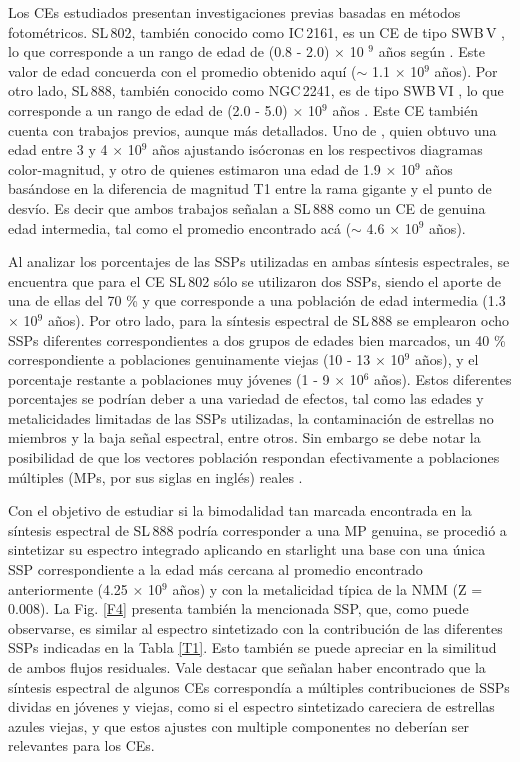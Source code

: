 \documentclass[baaa]{baaa}
\begin{document}
Los CEs estudiados presentan investigaciones previas basadas en métodos fotométricos. SL\,802, también conocido como IC\,2161, es un CE de tipo SWB\,V \citep{SWB1980}, lo que corresponde a un rango de edad de (0.8 - 2.0) $\times$ 10 $^{9}$ años según \cite{Bica1996}. Este valor de edad concuerda con el promedio obtenido aquí ($\sim$ 1.1 $\times$ 10$^{9}$ años). Por otro lado, SL\,888, también conocido como NGC\,2241, es de tipo SWB\,VI \citep{SWB1980}, lo que corresponde a un rango de edad de (2.0 - 5.0) $\times$ 10$^{9}$ años \citep{Bica1996}. Este CE también cuenta con trabajos previos, aunque más detallados. Uno de \cite{Jones1987}, quien obtuvo una edad entre 3 y 4 $\times$ 10$^{9}$ años ajustando isócronas en los respectivos diagramas color-magnitud, y otro de \cite{Geisler1997} quienes estimaron una edad de 1.9 $\times$ 10$^{9}$ años basándose en la diferencia de magnitud T1 entre la rama gigante y el punto de desvío. Es decir que ambos trabajos señalan a SL\,888 como un CE de genuina edad intermedia, tal como el promedio encontrado acá ($\sim$ 4.6 $\times$ 10$^{9}$ años).


Al analizar los porcentajes de las SSPs utilizadas en ambas síntesis espectrales, se encuentra que para el CE SL\,802 sólo se utilizaron dos SSPs, siendo el aporte de una de ellas del 70 \% y que corresponde a una población de edad intermedia (1.3 $\times$ 10$^{9}$ años). Por otro lado, para la síntesis espectral de SL\,888 se emplearon ocho SSPs diferentes correspondientes a dos grupos de edades bien marcados, un 40 \% correspondiente a poblaciones genuinamente viejas (10 - 13 $\times$ 10$^{9}$ años), y el porcentaje restante a poblaciones muy jóvenes (1 - 9 $\times$ 10$^{6}$ años). Estos diferentes porcentajes se podrían deber a una variedad de efectos, tal como las edades y metalicidades limitadas de las SSPs utilizadas, la contaminación de estrellas no miembros y la baja señal espectral, entre otros. Sin embargo se debe notar la posibilidad de que los vectores población respondan efectivamente a poblaciones múltiples (MPs, por sus siglas en inglés) reales \citep{AVA2019}. 


Con el objetivo de estudiar si la bimodalidad tan marcada encontrada en la síntesis espectral de SL\,888 podría corresponder a una MP genuina, se procedió a sintetizar su espectro integrado aplicando en {\sc starlight} una base con una única SSP correspondiente a la edad más cercana al promedio encontrado anteriormente (4.25 $\times$ 10$^{9}$ años) y con la metalicidad típica de la NMM (Z = 0.008). La Fig. \ref{F4} presenta también la mencionada SSP, que, como puede observarse, es similar al espectro sintetizado con la contribución de las diferentes SSPs indicadas en la Tabla \ref{T1}. Esto también se puede apreciar en la similitud de ambos flujos residuales. Vale destacar que \cite{CF2010C} señalan haber encontrado que la síntesis espectral de algunos CEs correspondía a múltiples contribuciones de SSPs dividas en jóvenes y viejas, como si el espectro sintetizado careciera de estrellas azules viejas, y que estos ajustes con multiple componentes no deberían ser relevantes para los CEs.
\end{document}

